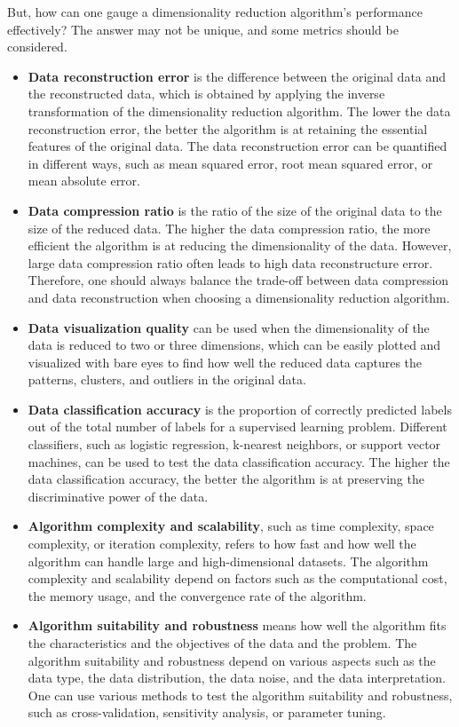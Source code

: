 But, how can one gauge a dimensionality reduction algorithm's performance effectively? The answer may not be unique, and some metrics should be considered.
\begin{itemize}
	\item \textbf{Data reconstruction error} is the difference between the original data and the reconstructed data, which is obtained by applying the inverse transformation of the dimensionality reduction algorithm. The lower the data reconstruction error, the better the algorithm is at retaining the essential features of the original data. The data reconstruction error can be quantified in different ways, such as mean squared error, root mean squared error, or mean absolute error.
	
	\item \textbf{Data compression ratio} is the ratio of the size of the original data to the size of the reduced data. The higher the data compression ratio, the more efficient the algorithm is at reducing the dimensionality of the data. However, large data compression ratio often leads to high data reconstructure error. Therefore, one should always balance the trade-off between data compression and data reconstruction when choosing a dimensionality reduction algorithm.
	
	\item \textbf{Data visualization quality} can be used when the dimensionality of the data is reduced to two or three dimensions, which can be easily plotted and visualized with bare eyes to find how well the reduced data captures the patterns, clusters, and outliers in the original data.
	
	\item \textbf{Data classification accuracy} is the proportion of correctly predicted labels out of the total number of labels for a supervised learning problem. Different classifiers, such as logistic regression, k-nearest neighbors, or support vector machines, can be used to test the data classification accuracy. The higher the data classification accuracy, the better the algorithm is at preserving the discriminative power of the data.
	
	\item \textbf{Algorithm complexity and scalability}, such as time complexity, space complexity, or iteration complexity, refers to how fast and how well the algorithm can handle large and high-dimensional datasets. The algorithm complexity and scalability depend on factors such as the computational cost, the memory usage, and the convergence rate of the algorithm. 
	
	\item \textbf{Algorithm suitability and robustness} means how well the algorithm fits the characteristics and the objectives of the data and the problem. The algorithm suitability and robustness depend on various aspects such as the data type, the data distribution, the data noise, and the data interpretation. One can use various methods to test the algorithm suitability and robustness, such as cross-validation, sensitivity analysis, or parameter tuning.
	
\end{itemize}

